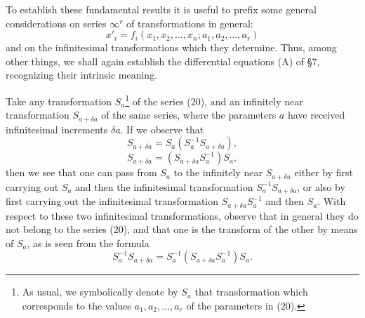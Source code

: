 \documentclass[11pt]{book}
\begin{document}
To establish these fundamental results it is useful to prefix some general considerations on series $\infty^r$ of transformations in general:
\begin{equation*}\tag{20}
 x'_i=f_i(x_1,x_2,\ldots,x_n; a_1,a_2,\ldots,a_r)
\end{equation*}
and on the infinitesimal transformations which they determine. Thus, among other things, we shall again establish the differential equations (A) of \S{}7, recognizing their intrinsic meaning.

Take any transformation $S_a$\footnote{As usual, we symbolically denote by $S_a$ that transformation which corresponds to the values $a_1,a_2,\ldots,a_r$ of the parameters in (20).} of the series (20), and an infinitely near transformation $S_{a+\delta a}$ of the same series, where the parameters $a$ have received infinitesimal increments $\delta a$. If we observe that
\[
 S_{a+\delta a}=S_a(S_a^{-1}S_{a+\delta a}),
\]
\[
 S_{a+\delta a}=(S_{a+\delta a}S_a^{-1})S_a,
\]
then we see that one can pass from $S_a$ to the infinitely near $S_{a+\delta a}$ either by first carrying out $S_a$ and then the infinitesimal transformation $S_a^{-1}S_{a+\delta a}$, or also by first carrying out the infinitesimal transformation $S_{a+\delta a}S_a^{-1}$ and then $S_a$. With respect to these two infinitesimal transformations, observe that in general they do not belong to the series (20), and that one is the transform of the other by means of $S_a$, as is seen from the formula
\[
 S_a^{-1}S_{a+\delta a}=S_a^{-1}(S_{a+\delta a}S_a^{-1})S_a.
\]
\end{document}
